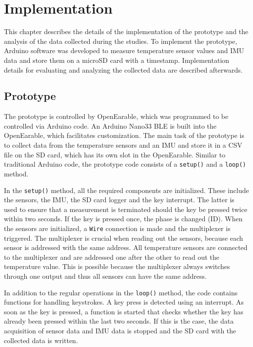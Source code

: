 \chapter{Implementation}
\label{ch:Implementation}
This chapter describes the details of the implementation of the prototype and the analysis of the data collected during the studies.
To implement the prototype, Arduino software was developed to measure temperature sensor values and IMU data and store them on a microSD card with a timestamp.
Implementation details for evaluating and analyzing the collected data are described afterwards.

\section{Prototype}
The prototype is controlled by OpenEarable, which was programmed to be controlled via Arduino code. 
An Arduino Nano33 BLE is built into the OpenEarable, which facilitates customization. 
The main task of the prototype is to collect data from the temperature sensors and an IMU and store it in a CSV file on the SD card, which has its own slot in the OpenEarable. 
Similar to traditional Arduino code, the prototype code consists of a \texttt{setup()} and a \texttt{loop()} method.

In the \texttt{setup()} method, all the required components are initialized. These include the sensors, the IMU, the SD card logger and the key interrupt. The latter is used to ensure that a measurement is terminated should the key be pressed twice within two seconds. If the key is pressed once, the phase is changed (ID). 
When the sensors are initialized, a \texttt{Wire} connection is made and the multiplexer is triggered.
The multiplexer is crucial when reading out the sensors, because each sensor is addressed with the same address.
All temperature sensors are connected to the multiplexer and are addressed one after the other to read out the temperature value.
This is possible because the multiplexer always switches through one output and thus all sensors can have the same address.

In addition to the regular operations in the \texttt{loop()} method, the code contains functions for handling keystrokes. A key press is detected using an interrupt. As soon as the key is pressed, a function is started that checks whether the key has already been pressed within the last two seconds. If this is the case, the data acquisition of sensor data and IMU data is stopped and the SD card with the collected data is written.

